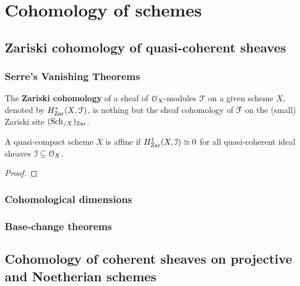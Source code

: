 \section{Cohomology of schemes}
    \subsection{Zariski cohomology of quasi-coherent sheaves}
        \subsubsection{Serre's Vanishing Theorems}
            \begin{definition} \label{def: zariski_cohomology}
                The \textbf{Zariski cohomology} of a sheaf of $\mathcal{O}_X$-modules $\mathcal{F}$ on a given scheme $X$, denoted by $H^*_{\mathrm{Zar}}(X, \mathcal{F})$, is nothing but the sheaf cohomology of $\mathcal{F}$ on the (small) Zariski site $(\mathrm{Sch}_{/X})_{\mathrm{Zar}}$. 
            \end{definition}
            
            \begin{theorem} \label{theorem: serre_cohomological_affineness_criterion}
                A quasi-compact scheme $X$ is affine if $H^1_{\mathrm{Zar}}(X, \mathcal{I}) \simeq 0$ for all quasi-coherent ideal sheaves $\mathcal{I} \subseteq \mathcal{O}_X$.
            \end{theorem}
                \begin{proof}
                    
                \end{proof}
        
        \subsubsection{Cohomological dimensions}
        
        \subsubsection{Base-change theorems}
        
    \subsection{Cohomology of coherent sheaves on projective and Noetherian schemes}